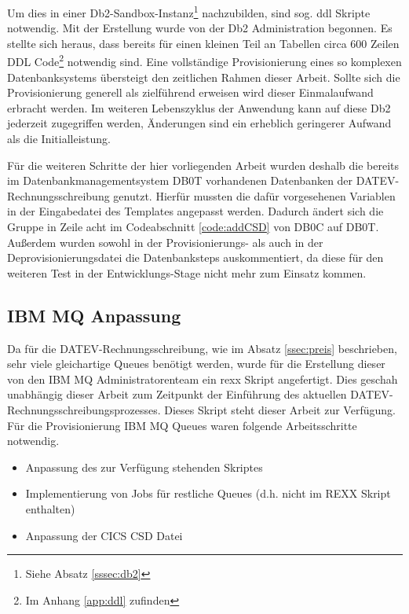 Um dies in einer Db2-Sandbox-Instanz\footnote{Siehe Absatz \ref{sssec:db2}} nachzubilden, sind sog. \Gls{ddl} Skripte notwendig. 
Mit der Erstellung wurde von der Db2 Administration begonnen.
Es stellte sich heraus, dass bereits für einen kleinen Teil an Tabellen circa 600 Zeilen DDL Code\footnote{Im Anhang \ref{app:ddl} zufinden} notwendig sind.
Eine vollständige Provisionierung eines so komplexen Datenbanksystems übersteigt den zeitlichen Rahmen dieser Arbeit.
Sollte sich die Provisionierung generell als zielführend erweisen wird dieser Einmalaufwand erbracht werden.
Im weiteren Lebenszyklus der Anwendung kann auf diese Db2 jederzeit zugegriffen werden, Änderungen sind ein erheblich geringerer Aufwand als die Initialleistung.

Für die weiteren Schritte der hier vorliegenden Arbeit wurden deshalb die bereits im Datenbankmanagementsystem DB0T vorhandenen Datenbanken der DATEV-Rechnungsschreibung genutzt.
Hierfür mussten die dafür vorgesehenen Variablen in der Eingabedatei des Templates angepasst werden.
Dadurch ändert sich die Gruppe in Zeile acht im Codeabschnitt \ref{code:addCSD} von \glqq DB0C\grqq{} auf \glqq DB0T\grqq.
Außerdem wurden sowohl in der Provisionierungs- als auch in der Deprovisionierungsdatei die Datenbanksteps auskommentiert, da diese für den weiteren Test in der Entwicklungs-Stage nicht mehr zum Einsatz kommen.

\subsection{IBM MQ Anpassung}\label{ssec:mqentw}
Da für die DATEV-Rechnungsschreibung, wie im Absatz \ref{ssec:preis} beschrieben, sehr viele gleichartige Queues benötigt werden, wurde für die Erstellung dieser von den IBM MQ Administratorenteam ein \Gls{rexx} Skript angefertigt.
Dies geschah unabhängig dieser Arbeit zum Zeitpunkt der Einführung des aktuellen DATEV-Rechnungsschreibungsprozesses.
Dieses Skript steht dieser Arbeit zur Verfügung.
Für die Provisionierung IBM MQ Queues waren folgende Arbeitsschritte notwendig.

\begin{samepage}
\begin{itemize}
\item Anpassung des zur Verfügung stehenden Skriptes
\item Implementierung von Jobs für restliche Queues (d.h. nicht im REXX Skript enthalten)
\item Anpassung der CICS CSD Datei
\end{itemize}
\end{samepage}

